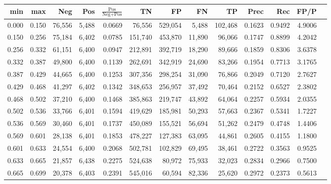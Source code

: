 \begin{tabular}{rrrrrrrrrrrrr}
\toprule
  min &   max &    Neg &   Pos & $\frac{\text{Pos}}{\text{Neg}+\text{Pos}}$ &      TN &      FP &      FN &      TP &   Prec &    Rec &   FP/P \\
\midrule
0.000 & 0.150 & 76,556 & 5,488 &                                     0.0669 &  76,556 & 529,054 &   5,488 & 102,468 & 0.1623 & 0.9492 & 4.9006 \\
0.150 & 0.256 & 75,184 & 6,402 &                                     0.0785 & 151,740 & 453,870 &  11,890 &  96,066 & 0.1747 & 0.8899 & 4.2042 \\
0.256 & 0.332 & 61,151 & 6,400 &                                     0.0947 & 212,891 & 392,719 &  18,290 &  89,666 & 0.1859 & 0.8306 & 3.6378 \\
0.332 & 0.387 & 49,800 & 6,400 &                                     0.1139 & 262,691 & 342,919 &  24,690 &  83,266 & 0.1954 & 0.7713 & 3.1765 \\
0.387 & 0.429 & 44,665 & 6,400 &                                     0.1253 & 307,356 & 298,254 &  31,090 &  76,866 & 0.2049 & 0.7120 & 2.7627 \\
0.429 & 0.468 & 41,297 & 6,402 &                                     0.1342 & 348,653 & 256,957 &  37,492 &  70,464 & 0.2152 & 0.6527 & 2.3802 \\
0.468 & 0.502 & 37,210 & 6,400 &                                     0.1468 & 385,863 & 219,747 &  43,892 &  64,064 & 0.2257 & 0.5934 & 2.0355 \\
0.502 & 0.536 & 33,766 & 6,401 &                                     0.1594 & 419,629 & 185,981 &  50,293 &  57,663 & 0.2367 & 0.5341 & 1.7227 \\
0.536 & 0.569 & 30,460 & 6,401 &                                     0.1737 & 450,089 & 155,521 &  56,694 &  51,262 & 0.2479 & 0.4748 & 1.4406 \\
0.569 & 0.601 & 28,138 & 6,401 &                                     0.1853 & 478,227 & 127,383 &  63,095 &  44,861 & 0.2605 & 0.4155 & 1.1800 \\
0.601 & 0.633 & 24,554 & 6,400 &                                     0.2068 & 502,781 & 102,829 &  69,495 &  38,461 & 0.2722 & 0.3563 & 0.9525 \\
0.633 & 0.665 & 21,857 & 6,438 &                                     0.2275 & 524,638 &  80,972 &  75,933 &  32,023 & 0.2834 & 0.2966 & 0.7500 \\
0.665 & 0.699 & 20,378 & 6,403 &                                     0.2391 & 545,016 &  60,594 &  82,336 &  25,620 & 0.2972 & 0.2373 & 0.5613 \\

\end{tabular}
